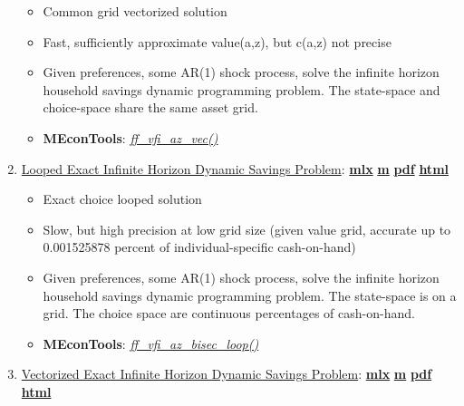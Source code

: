 \documentclass[
]{book}
\providecommand{\tightlist}{%
  \setlength{\itemsep}{0pt}\setlength{\parskip}{0pt}}
\begin{document}
\begin{enumerate}
  \begin{itemize}
  \tightlist
  \item
    Common grid vectorized solution
  \item
    Fast, sufficiently approximate value(a,z), but c(a,z) not precise
  \item
    Given preferences, some AR(1) shock process, solve the infinite horizon household savings dynamic programming problem. The state-space and choice-space share the same asset grid.
  \item
    \textbf{MEconTools}: \emph{\href{https://github.com/FanWangEcon/MEconTools/blob/master/MEconTools/vfi/ff_vfi_az_vec.m}{ff\_vfi\_az\_vec()}}
  \end{itemize}
\item
  \href{https://fanwangecon.github.io/MEconTools/MEconTools/doc/vfi/htmlpdfm/fx_vfi_az_bisec_loop.html}{Looped Exact Infinite Horizon Dynamic Savings Problem}: \href{https://github.com/FanWangEcon/MEconTools/blob/master/MEconTools/doc/vfi/fx_vfi_az_bisec_loop.mlx}{\textbf{mlx}} \textbar{} \href{https://github.com/FanWangEcon/MEconTools/blob/master/MEconTools/doc/vfi/htmlpdfm/fx_vfi_az_bisec_loop.m}{\textbf{m}} \textbar{} \href{https://github.com/FanWangEcon/MEconTools/blob/master/MEconTools/doc/vfi/htmlpdfm/fx_vfi_az_bisec_loop.pdf}{\textbf{pdf}} \textbar{} \href{https://fanwangecon.github.io/MEconTools/MEconTools/doc/vfi/htmlpdfm/fx_vfi_az_bisec_loop.html}{\textbf{html}}

  \begin{itemize}
  \tightlist
  \item
    Exact choice looped solution
  \item
    Slow, but high precision at low grid size (given value grid, accurate up to 0.001525878 percent of individual-specific cash-on-hand)
  \item
    Given preferences, some AR(1) shock process, solve the infinite horizon household savings dynamic programming problem. The state-space is on a grid. The choice space are continuous percentages of cash-on-hand.
  \item
    \textbf{MEconTools}: \emph{\href{https://github.com/FanWangEcon/MEconTools/blob/master/MEconTools/vfi/ff_vfi_az_bisec_loop.m}{ff\_vfi\_az\_bisec\_loop()}}
  \end{itemize}
\item
  \href{https://fanwangecon.github.io/MEconTools/MEconTools/doc/vfi/htmlpdfm/fx_vfi_az_bisec_vec.html}{Vectorized Exact Infinite Horizon Dynamic Savings Problem}: \href{https://github.com/FanWangEcon/MEconTools/blob/master/MEconTools/doc/vfi/fx_vfi_az_bisec_vec.mlx}{\textbf{mlx}} \textbar{} \href{https://github.com/FanWangEcon/MEconTools/blob/master/MEconTools/doc/vfi/htmlpdfm/fx_vfi_az_bisec_vec.m}{\textbf{m}} \textbar{} \href{https://github.com/FanWangEcon/MEconTools/blob/master/MEconTools/doc/vfi/htmlpdfm/fx_vfi_az_bisec_vec.pdf}{\textbf{pdf}} \textbar{} \href{https://fanwangecon.github.io/MEconTools/MEconTools/doc/vfi/htmlpdfm/fx_vfi_az_bisec_vec.html}{\textbf{html}}


\end{enumerate}
\end{document}

